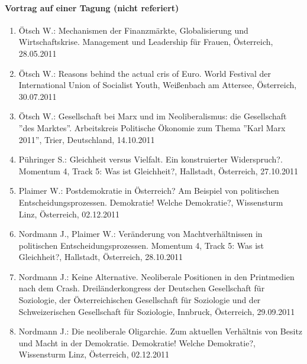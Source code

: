 \paragraph{Vortrag auf einer Tagung (nicht referiert)}
\begin{enumerate}
	\item Ötsch W.: Mechanismen der Finanzmärkte, Globalisierung und Wirtschaftskrise. Management und Leadership für Frauen, Österreich, 28.05.2011
	\item Ötsch W.: Reasons behind the actual cris of Euro. World Festival der International Union of Socialist Youth, Weißenbach am Attersee, Österreich, 30.07.2011
	\item Ötsch W.: Gesellschaft bei Marx und im Neoliberalismus: die Gesellschaft ''des Marktes''. Arbeitskreis Politische Ökonomie zum Thema ''Karl Marx 2011'', Trier, Deutschland, 14.10.2011
	\item Pühringer S.: Gleichheit versus Vielfalt. Ein konstruierter Widerspruch?. Momentum 4, Track 5: Was ist Gleichheit?, Hallstadt, Österreich, 27.10.2011
	\item Plaimer W.: Postdemokratie in Österreich? Am Beispiel von politischen Entscheidungsprozessen. Demokratie! Welche Demokratie?, Wissensturm Linz, Österreich, 02.12.2011
	\item Nordmann J., Plaimer W.: Veränderung von Machtverhältnissen in politischen Entscheidungsprozessen. Momentum 4, Track 5: Was ist Gleichheit?, Hallstadt, Österreich, 28.10.2011
	\item Nordmann J.: Keine Alternative. Neoliberale Positionen in den Printmedien nach dem Crash. Dreiländerkongress der Deutschen Gesellschaft für Soziologie, der Österreichischen Gesellschaft für Soziologie und der Schweizerischen Gesellschaft für Soziologie, Innbruck, Österreich, 29.09.2011
	\item Nordmann J.: Die neoliberale Oligarchie. Zum aktuellen Verhältnis von Besitz und Macht in der Demokratie. Demokratie! Welche Demokratie?, Wissensturm Linz, Österreich, 02.12.2011
\end{enumerate}
